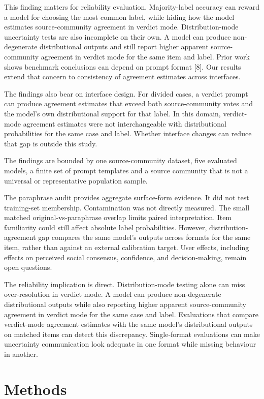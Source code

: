 \documentclass[11pt]{article}
\begin{document}
This finding matters for reliability evaluation. Majority-label accuracy can reward a model for choosing the most common label, while hiding how the model estimates source-community agreement in verdict mode. Distribution-mode uncertainty tests are also incomplete on their own. A model can produce non-degenerate distributional outputs and still report higher apparent source-community agreement in verdict mode for the same item and label. Prior work shows benchmark conclusions can depend on prompt format [8]. Our results extend that concern to consistency of agreement estimates across interfaces.

The findings also bear on interface design. For divided cases, a verdict prompt can produce agreement estimates that exceed both source-community votes and the model's own distributional support for that label. In this domain, verdict-mode agreement estimates were not interchangeable with distributional probabilities for the same case and label. Whether interface changes can reduce that gap is outside this study.

The findings are bounded by one source-community dataset, five evaluated models, a finite set of prompt templates and a source community that is not a universal or representative population sample.

The paraphrase audit provides aggregate surface-form evidence. It did not test training-set membership. Contamination was not directly measured. The small matched original-vs-paraphrase overlap limits paired interpretation. Item familiarity could still affect absolute label probabilities. However, distribution-agreement gap compares the same model's outputs across formats for the same item, rather than against an external calibration target. User effects, including effects on perceived social consensus, confidence, and decision-making, remain open questions.

The reliability implication is direct. Distribution-mode testing alone can miss over-resolution in verdict mode. A model can produce non-degenerate distributional outputs while also reporting higher apparent source-community agreement in verdict mode for the same case and label. Evaluations that compare verdict-mode agreement estimates with the same model's distributional outputs on matched items can detect this discrepancy. Single-format evaluations can make uncertainty communication look adequate in one format while missing behaviour in another.

\section{Methods}
\end{document}
